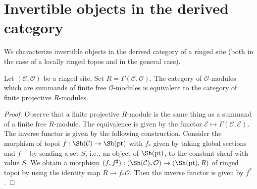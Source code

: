 \section{Invertible objects in the derived category}
\label{section-invertible-D-or-R}

\noindent
We characterize invertible objects in the derived category of
a ringed site (both in the case of a locally ringed topos and
in the general case).

\begin{lemma}
\label{lemma-category-summands-finite-free}
Let $(\mathcal{C}, \mathcal{O})$ be a ringed site.
Set $R = \Gamma(\mathcal{C}, \mathcal{O})$. The category of
$\mathcal{O}$-modules which are summands of finite free
$\mathcal{O}$-modules is equivalent to the category of
finite projective $R$-modules.
\end{lemma}

\begin{proof}
Observe that a finite projective $R$-module is the same thing
as a summand of a finite free $R$-module.
The equivalence is given by the functor $\mathcal{E} \mapsto
\Gamma(\mathcal{C}, \mathcal{E})$.
The inverse functor is given by the following construction.
Consider the morphism of topoi $f : \Sh(\mathcal{C}) \to \Sh(\text{pt})$
with $f_*$ given by taking global sections and
$f^{-1}$ by sending a set $S$, i.e., an object of
$\Sh(\text{pt})$, to the constant sheaf with value $S$.
We obtain a morphism
$(f, f^\sharp) : (\Sh(\mathcal{C}), \mathcal{O}) \to (\Sh(\text{pt}), R)$
of ringed topoi by using the identity map $R \to f_*\mathcal{O}$.
Then the inverse functor is given by $f^*$.
\end{proof}

